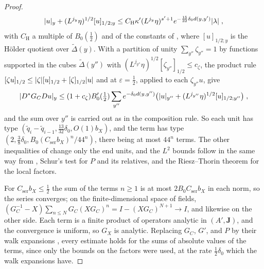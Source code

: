 \documentclass[11pt]{preprint}
\DeclarePairedDelimiter{\abs}{\lvert}{\rvert}
\numberwithin{equation}{section}
\theoremstyle{definition}
\theoremstyle{remark}
\theoremstyle{plain}
\begin{document}
\begin{proof}
\[
    \abs u_y + (L^{j_y}\eta)^{1/2}[u]_{1/2;y} \leq C_{\mathrm H}\kappa'(L^{j_y}\eta)^{s'+1}e^{-\frac{15}{32}\delta_0d(y,y')}\abs\lambda\;,
\]
with $C_{\mathrm H}$ a multiple of $B_0(\frac12)$ and of the constants of \cite[(3.49)]{BalabanPBG}, where $[u]_{1/2;y}$ is the H\"older quotient over $\tilde\Delta(y)$. With a partition of unity $\sum_{y''}\zeta_{y''} = 1$ by functions supported in the cubes $\tilde\Delta(y'')$ with $(L^{j_{y''}}\eta)^{1/2}[\zeta_{y''}]_{1/2} \leq c_\zeta$, the product rule $[\zeta u]_{1/2} \leq \abs\zeta[u]_{1/2} + [\zeta]_{1/2}\abs u$ and \cite[(3.44)]{BalabanPBG} at $\varepsilon = \frac12$, applied to each $\zeta_{y''}u$, give
\[
    \abs{D^*G_CDu}_y \leq (1 + c_\zeta)B'_0(\tfrac12)\sum_{y''}e^{-\delta_0d(y,y'')}\bigl(\abs u_{y''} + (L^{j_{y''}}\eta)^{1/2}[u]_{1/2;y''}\bigr)\;,
\]
and the sum over $y''$ is carried out as in the composition rule. So each unit has type $(\tilde q_i - \tilde q_{i-1}, \frac{13}{32}\delta_0, O(1)b_X)$, and the term has type $(2, \frac38\delta_0, B_0(C_{\mathrm{ser}}b_X)^n/44^n)$, there being at most $44^n$ terms. The other inequalities of \cite[Theorem~3.3]{BalabanPBG} change only the end units, and the $L^2$ bounds follow in the same way from \cite[(3.46)]{BalabanPBG}, Schur's test for $P$ and its relatives, and the Riesz--Thorin theorem for the local factors.

For $C_{\mathrm{ser}}b_X \leq \frac12$ the sum of the terms $n \geq 1$ is at most $2B_0C_{\mathrm{ser}}b_X$ in each norm, so the series converges; on the finite-dimensional space of fields, $(G_C^{-1} - X)\sum_{n \leq N}G_C(XG_C)^n = I - (XG_C)^{N+1} \to I$, and likewise on the other side. Each term is a finite product of operators analytic in $(A', \mathbf J)$, and the convergence is uniform, so $G_X$ is analytic. Replacing $G_C$, $G'$, and $P$ by their walk expansions \cite[(3.90), (3.94), (3.98)--(3.99), (3.107)--(3.108)]{BalabanPBG}, every estimate holds for the sums of absolute values of the terms, since only the bounds on the factors were used, at the rate $\frac12\delta_0$ which the walk expansions have.
\end{proof}
\end{document}
